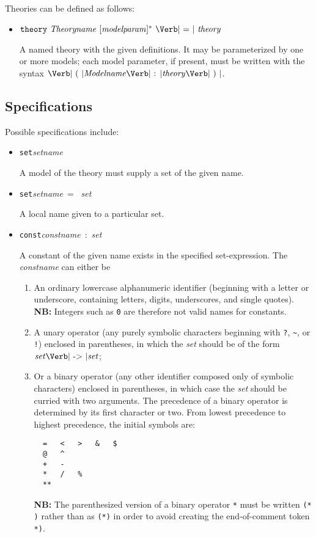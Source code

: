 \documentclass[11pt]{article}
\newcommand{\keywd}[1]{\mbox{\texttt{#1}}\xspace}
\newcommand{\CONST}{\keywd{const}}
\newcommand{\SET}{\keywd{set}}
\newcommand{\THEORY}{\keywd{theory}}
\newcommand{\metav}[1]{\mbox{\textit{#1}}\xspace}
\newcommand{\MIdentifier}{\metav{Modelname}}
\newcommand{\Setexp}{\metav{set}}
\newcommand{\MParam}{\metav{modelparam}}
\newcommand{\Theoryexp}{\metav{theory}}
\newcommand{\COLON}{\mbox{\Verb| : |}}
\newcommand{\EQUALS}{\mbox{\Verb| = |}}
\newcommand{\LPAREN}{\mbox{\Verb| ( |}}
\newcommand{\RPAREN}{\mbox{\Verb| ) |}}
\newcommand{\TO}{\mbox{\Verb| -> |}}
\newcommand{\NB}{\textbf{NB: }}
\begin{document}
\noindent Theories can be defined as follows:
\begin{itemize}
\item $\THEORY\ \metav{Theoryname}\ [\MParam]^*\ \EQUALS\ \Theoryexp$

   A named theory with the given definitions.  It may be parameterized
   by one or more models; each model parameter, if present, must be written
   with the syntax $\LPAREN \MIdentifier \COLON \Theoryexp \RPAREN$.
\end{itemize}



\subsection{Specifications}
Possible
specifications include:
\begin{itemize}
\item \SET \metav{setname}

A model of the theory must supply a set of the given name.

\item \SET \metav{setname}\ = \ \Setexp

A local name given to a particular set.

\item \CONST \metav{constname}\ :\ \Setexp

A constant of the given name exists in the specified set-expression.
The \metav{constname} can either be
\begin{enumerate}
\item An ordinary lowercase alphanumeric identifier (beginning with a
  letter or underscore, containing letters, digits, underscores, and
  single quotes).
  \NB Integers such as \Verb|0| are therefore not valid names for constants.
\item A unary operator (any purely symbolic characters beginning with \Verb|?|, \Verb|~|, or \Verb|!|) enclosed in parentheses, in which the \Setexp should be of the form $\Setexp \TO \Setexp$;
\item Or a binary operator (any other identifier composed only of
  symbolic characters) enclosed in parentheses, in which case the
  \Setexp should be curried with two arguments.  The precedence of a
  binary operator is determined by its first character or two.  From
  lowest precedence to highest precedence, the initial symbols are:
\begin{Verbatim}
  =   <   >   &   $
  @   ^
  +   -
  *   /   %
  **
\end{Verbatim}
\NB The parenthesized version of a binary operator \Verb|*| must be
written \Verb|(* )| rather than as \Verb|(*)| in order to avoid
creating the end-of-comment token \Verb|*)|.
\end{enumerate}




\end{itemize}
\end{document}
